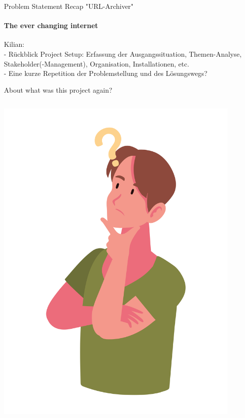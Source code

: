 \documentclass[
    ngerman,%
    authorontitle=true,
]{bfhbeamer}
\begin{document}
    \begin{frame}{Problem Statement Recap "URL-Archiver"}
    	\framesubtitle{The ever changing internet}
    	Kilian: \\
    	- Rückblick Project Setup: Erfassung der Ausgangssituation, Themen-Analyse, Stakeholder(-Management), Organisation, Installationen, etc.\\
    	- Eine kurze Repetition der Problemstellung und des Lösungswegs?
    \end{frame}


    \begin{frame}{About what was this project again?}
  
    	\begin{columns} %
    		\begin{column}{0.3\textwidth} %
	    		\begin{center}
	    			\includegraphics[width=0.9\textwidth]{pictures/final_presentation/thinking1.jpg}
	    		\end{center}
    		\end{column}
    	\end{columns}
    \end{frame}
\end{document}
